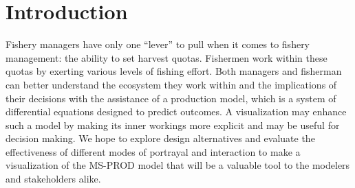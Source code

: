 %
\chapter{Introduction}                %

Fishery managers have only one ``lever'' to pull when it comes to fishery management: the ability to set harvest quotas.  Fishermen work within these quotas by exerting various levels of fishing effort.  Both managers and fisherman can better understand the ecosystem they work within and the implications of their decisions with the assistance of a production model, which is a system of differential equations designed to predict outcomes.  A visualization may enhance such a model by making its inner workings more explicit and may be useful for decision making. We hope to explore design alternatives and evaluate the effectiveness of different modes of portrayal and interaction to make a visualization of the MS-PROD model that will be a valuable tool to the modelers and stakeholders alike. 
